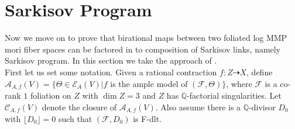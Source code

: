 \documentclass[12pt]{amsart}%
\theoremstyle{plain}
\theoremstyle{remark}
\theoremstyle{definition}
\newcommand{\<}{\leq}
\newcommand{\mbQ}{\mathbb{Q}}
\def\dim{\operatorname{dim}}
\theoremstyle{definition}
\theoremstyle{definition}
\numberwithin{equation}{section}
\theoremstyle{remark}
\begin{document}
\section{Sarkisov Program}
Now we move on to prove that birational maps between two foliated log MMP mori fiber spaces can be factored in to composition of Sarkisov links, namely Sarkisov program. In this section we take the approach of \cite{HM09}.\\
First let us set some notation. Given a rational contraction $f:Z\dashrightarrow X$, define
$\mathcal{A}_{A,f}(V)=\lbrace \Theta\in \mathcal{E}_{A}(V)|f$ is the ample model of $(\mathcal{F},\Theta)\rbrace$, where $\mathcal{F}$ is a co-rank $1$ foliation on $Z$ with $\dim Z=3$ and $Z$ has $\mbQ$-factorial singularities. Let $\mathcal{C}_{A,f}(V)$ denote the closure of $\mathcal{A}_{A,f}(V)$. Also assume there is a $\mbQ$-divisor $D_0$ with $\lfloor D_0\rfloor=0$ such that $(\mathcal{F},D_0)$ is F-dlt.
\end{document}
